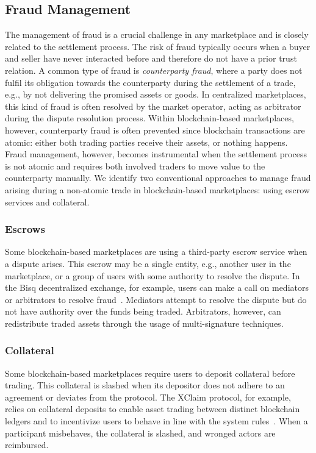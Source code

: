 \subsection{Fraud Management}
The management of fraud is a crucial challenge in any marketplace and is closely related to the settlement process.
The risk of fraud typically occurs when a buyer and seller have never interacted before and therefore do not have a prior trust relation.
A common type of fraud is \emph{counterparty fraud}, where a party does not fulfil its obligation towards the counterparty during the settlement of a trade, e.g., by not delivering the promised assets or goods.
In centralized marketplaces, this kind of fraud is often resolved by the market operator, acting as arbitrator during the dispute resolution process.
Within blockchain-based marketplaces, however, counterparty fraud is often prevented since blockchain transactions are atomic: either both trading parties receive their assets, or nothing happens.
Fraud management, however, becomes instrumental when the settlement process is not atomic and requires both involved traders to move value to the counterparty manually. %
We identify two conventional approaches to manage fraud arising during a non-atomic trade in blockchain-based marketplaces: using escrow services and collateral.

\subsubsection{Escrows}
Some blockchain-based marketplaces are using a third-party escrow service when a dispute arises.
This escrow may be a single entity, e.g., another user in the marketplace, or a group of users with some authority to resolve the dispute.
In the Bisq decentralized exchange, for example, users can make a call on mediators or arbitrators to resolve fraud~\cite{bisq}.
Mediators attempt to resolve the dispute but do not have authority over the funds being traded.
Arbitrators, however, can redistribute traded assets through the usage of multi-signature techniques.

\subsubsection{Collateral}
Some blockchain-based marketplaces require users to deposit collateral before trading.
This collateral is slashed when its depositor does not adhere to an agreement or deviates from the protocol.
The XClaim protocol, for example, relies on collateral deposits to enable asset trading between distinct blockchain ledgers and to incentivize users to behave in line with the system rules~\cite{zamyatin2019xclaim}.
When a participant misbehaves, the collateral is slashed, and wronged actors are reimbursed.

